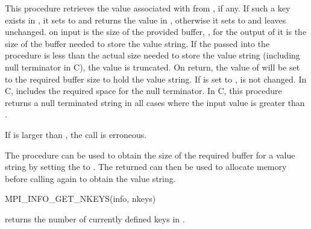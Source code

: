 This procedure retrieves the value associated with  from , if any.
If such a key exists in , it sets  to 
and returns the value in ,
otherwise it sets  to  and leaves
 unchanged. 
 on input is the size of the provided buffer, , for the output of  it is the size of the buffer needed to store the
value string. If the  passed into the procedure is less than the
actual size needed to store the value string (including null terminator in C), the value is
truncated. On return, the value of  will be set to the required
buffer size to hold the value string. If  is set to ,  is not changed. 
In C,  
includes the required space for the null terminator. In C,
this procedure returns a null terminated string in all cases where
the  input value is greater than .

If  is larger than , 
the call is erroneous. 

\begin{users}
The  procedure can be used to obtain the size of
the required buffer for a value string by setting the  to . The returned
 can then be used to allocate memory before calling
 again to obtain the value string.
\end{users}

%
\begin{funcdef}{MPI\_INFO\_GET\_NKEYS}{(\mbox{info}, \mbox{nkeys})}
\end{funcdef}

 returns the number of currently defined keys in .


